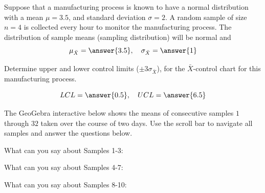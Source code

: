 \documentclass{ximera}
\begin{document}
\begin{problem}\label{prob:controlChartWithSlider}
Suppose that a manufacturing process is known to have a normal distribution with a mean $\mu=3.5$, and standard deviation $\sigma=2$.  A random sample of size $n=4$ is collected every hour to monitor the manufacturing process.  The distribution of sample means (sampling distribution) will be normal and $$\mu_{\bar{X}}=\answer{3.5},\quad \sigma_{\bar{X}}=\answer{1}$$

Determine upper and lower control limits ($\pm 3\sigma_{\bar{X}}$), for the $\bar{X}$-control chart for this manufacturing process.

$$LCL=\answer{0.5},\quad UCL=\answer{6.5}$$

The GeoGebra interactive below shows the means of consecutive samples $1$ through $32$ taken over the course of two days.  Use the scroll bar to navigate all samples and answer the questions below.

\begin{onlineOnly}
\begin{center}
\end{center}
\end{onlineOnly}

What can you say about Samples  1-3:
\begin{multipleChoice}
\end{multipleChoice}

What can you say about Samples  4-7:
\begin{multipleChoice}
\end{multipleChoice}

What can you say about Samples  8-10:
\begin{multipleChoice}
\end{multipleChoice}


\end{problem}
\end{document}
